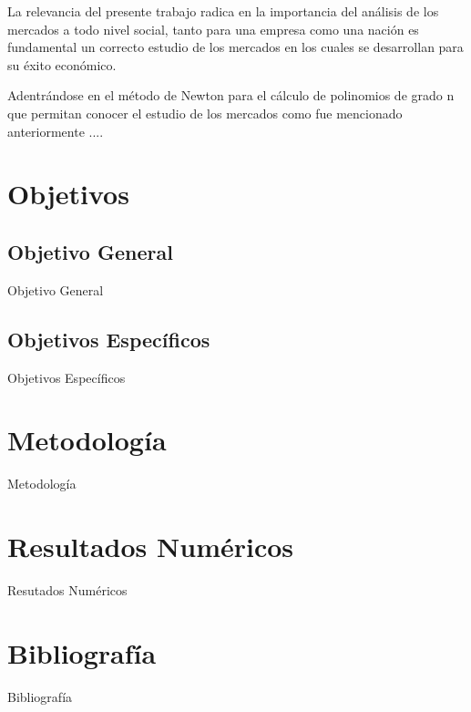 \documentclass[conference]{IEEEtran}
\begin{document}
La relevancia del presente trabajo radica en la importancia del análisis de los mercados a todo nivel social, tanto para una empresa como una nación es fundamental un correcto estudio de los mercados en los cuales se desarrollan para su éxito económico. 


Adentrándose en el método de Newton para el cálculo de polinomios de grado n que permitan conocer el estudio de los mercados como fue mencionado anteriormente ....



\section{Objetivos}

\subsection{Objetivo General}
Objetivo General

\subsection{Objetivos Específicos}
Objetivos Específicos

\section{Metodología}
Metodología

\section{Resultados Numéricos}
Resutados Numéricos

\section{Bibliografía}
Bibliografía
\end{document}
